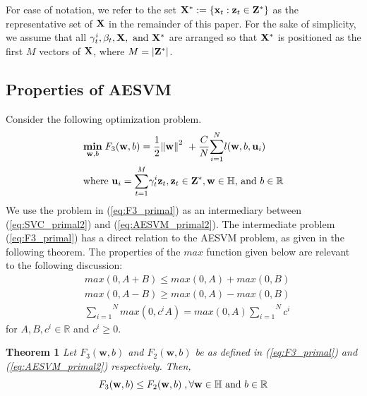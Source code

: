 \documentclass[twoside]{article}
\begin{document}
For ease of notation, we refer to the set ${\bf X}^* := \{{\bf x}_t:{\bf z}_t \in {\bf Z}^*\}$ as the representative set of ${\bf X}$ in the remainder of this paper. For the sake of simplicity, we assume that all $\gamma^i _t, \beta_t, {\bf X}, \text{ and } {\bf X}^*$ are arranged so that ${\bf X}^*$ is positioned as the first $M$ vectors of ${\bf X}$, where $M = |{\bf Z}^*|$.

\subsection{Properties of AESVM}\label{sec:prop}
Consider the following optimization problem.
\begin{align}
&\underset{\mathbf{w} ,b}{\mathbf{min}}\;F_3 (\mathbf{w}, b) = \frac{1}{2}{\|{\mathbf{w}}\|}^{2}\ + \frac{C}{N} \overset{N}{\underset{i = 1}\sum} l(\mathbf{w},b,{\bf u}_i) \label{eq:F3_primal}\\
&\text{where }{\bf u}_i = \overset{M}{\underset{t = 1}\sum} \gamma^i _t  {\bf z}_t, {\bf z}_t \in {\bf Z}^*,{\bf w} \in \mathbb{H}\text{, and } b \in \mathbb{R}\nonumber
\end{align}
We use the problem in (\ref{eq:F3_primal}) as an intermediary between (\ref{eq:SVC_primal2}) and (\ref{eq:AESVM_primal2}). The intermediate problem (\ref{eq:F3_primal}) has a direct relation to the AESVM problem, as given in the following theorem. The properties of the $max$ function given below are relevant to the following discussion:
\begin{align}
&max(0,A+B) \le max(0,A) + max(0,B) \label{eq:maxA}\\
&max(0,A-B) \ge max(0,A) - max(0,B) \label{eq:maxB}\\
&\overset{N}{\underset{i = 1}{\sum}} max(0,c^i A) = max(0,A) \overset{N}{\underset{i = 1}{\sum}}c^i \label{eq:maxC}
\end{align}
for $A,B,c^i \in \mathbb{R}$ and $c^i \ge 0$.

\noindent
{\bf Theorem 1} {\it Let $F_3 (\mathbf{w}, b)$ and $F_2 (\mathbf{w}, b)$ be as defined in (\ref{eq:F3_primal}) and (\ref{eq:AESVM_primal2}) respectively. Then,
\begin{equation*}
F_3 (\mathbf{w}, b) \le F_2 (\mathbf{w}, b)\;, \forall {\bf w} \in \mathbb{H} \text{ and } b \in \mathbb{R}
\end{equation*}}
\end{document}
